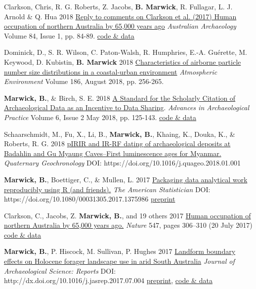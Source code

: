 \documentclass[11pt,article,oneside]{memoir}
\begin{document}

\ind Clarkson, Chris, R. G. Roberts, Z. Jacobs, \textbf{B. Marwick}, R. Fullagar, L. J. Arnold \& Q. Hua 2018 \href{https://doi.org/10.1080/03122417.2018.1462884}{Reply to comments on Clarkson et al. (2017) Human occupation of northern Australia by 65,000 years ago} \textit{Australian Archaeology} Volume 84, Issue 1, pp. 84-89. \href{https://osf.io/qydc9/}{code \& data}

\ind Dominick, D., S. R. Wilson, C. Paton-Walsh, R. Humphries, E.-A. Guérette, M. Keywood, D. Kubistin, \textbf{B. Marwick} 2018 \href{http://doi.org/10.1016/j.atmosenv.2018.05.031 }{Characteristics of airborne particle number size distributions in a coastal-urban environment}  \textit{Atmospheric Environment} Volume 186, August 2018, pp. 256-265.

\ind \textbf{Marwick, B.}, \& Birch, S. E. 2018 \href{https://doi.org/10.1017/aap.2018.3}{A Standard for the Scholarly Citation of Archaeological Data as an Incentive to Data Sharing}.  \textit{Advances in Archaeological Practice} Volume 6, Issue 2 May 2018, pp. 125-143. \href{https://doi.org/10.17605/OSF.IO/KSRUZ}{code \& data}

\ind Schaarschmidt, M., Fu, X., Li, B., \textbf{Marwick, B.}, Khaing, K., Douka, K., \& Roberts, R. G. 2018 \href{https://doi.org/10.1016/j.quageo.2018.01.001}{pIRIR and IR-RF dating of archaeological deposits at Badahlin and Gu Myaung Caves–First luminescence ages for Myanmar.} \textit{Quaternary Geochronology} DOI: https://doi.org/10.1016/j.quageo.2018.01.001

\ind \textbf{Marwick, B.}, Boettiger, C., \& Mullen, L. 2017 \href{https://doi.org/10.1080/00031305.2017.1375986}{Packaging data analytical work reproducibly using R (and friends).} \textit{The American Statistician} \newline DOI: https://doi.org/10.1080/00031305.2017.1375986 \href{https://doi.org/10.7287/peerj.preprints.3192v1}{preprint}

\ind  Clarkson, C., Jacobs, Z. \textbf{Marwick, B.}, and 19 others 2017 \href{http://dx.doi.org/10.1038/nature22968}{Human occupation of northern Australia by 65,000 years ago.} \textit{Nature} 547, pages 306–310 (20 July 2017) \href{https://doi.org/10.17605/OSF.IO/QWFCZ}{code \& data}

\ind  \textbf{Marwick, B.}, P. Hiscock, M. Sullivan, P. Hughes 2017 \href{http://dx.doi.org/10.1016/j.jasrep.2017.07.004}{Landform boundary effects on Holocene forager landscape use in arid South Australia} \textit{Journal of Archaeological Science: Reports} DOI: http://dx.doi.org/10.1016/j.jasrep.2017.07.004 \href{https://doi.org/10.17605/OSF.IO/V2MS9}{preprint}, \href{https://doi.org/10.17605/OSF.IO/EDZXS}{code \& data}
\end{document}
